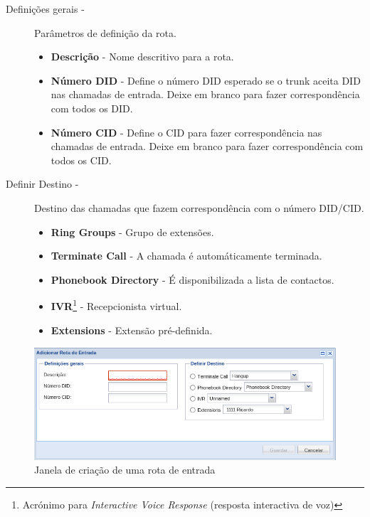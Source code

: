 \begin{description}
	
            \item[Definições gerais -] Parâmetros de definição da rota.
                \begin{itemize}
                    \item \textbf{Descrição} - Nome descritivo para a rota.
                    \item \textbf{Número DID} - Define o número DID esperado se o trunk aceita DID nas chamadas de entrada. Deixe em branco para fazer correspondência com todos os DID.
                    \item \textbf{Número CID} - Define o CID para fazer correspondência nas chamadas de entrada. Deixe em branco para fazer correspondência com todos os CID.
                \end{itemize}

            \item[Definir Destino -] Destino das chamadas que fazem correspondência com o número DID/CID.
                \begin{itemize}
                    \item \textbf{Ring Groups} - Grupo de extensões.
                    \item \textbf{Terminate Call} - A chamada é automáticamente terminada.
                    \item \textbf{Phonebook Directory} - É disponibilizada a lista de contactos.
                    \item \textbf{IVR}\footnote{Acrónimo para \emph{Interactive Voice Response} (resposta interactiva de voz)} - Recepcionista virtual.
                    \item \textbf{Extensions} - Extensão pré-definida.
                \end{itemize}
       
\end{description}

\begin{figure}[H]
        \begin{center}
        \includegraphics[scale=0.4]{screenshots/etvoip_pbx_inbound_routes_add.png}
        \caption{Janela de criação de uma rota de entrada}
        \label{fig:etvoip_pbx_inbound_routes_add}
        \end{center}
\end{figure}

